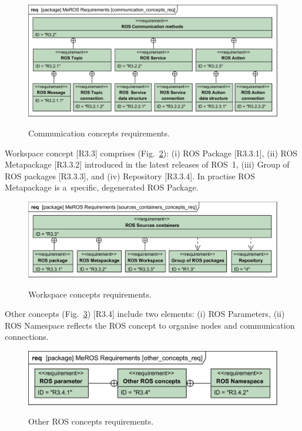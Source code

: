 \documentclass[11pt,oneside,a4paper]{report}
\begin{document}
	\begin{figure}[H]
		\centering
		\begin{center}
			{\includegraphics[scale=.98]{diagrams/communication_concepts_req.png}}
		\end{center}
		\caption{Communication concepts requirements.} 
		\label{fig:communication_concepts_req}
	\end{figure}
	
	Workspace concept [R3.3] comprises (Fig.~\ref{fig:workspace_concepts_req}): (i) ROS Package [R3.3.1], (ii) ROS Metapackage [R3.3.2] introduced in the latest releases of ROS~1, (iii) Group of ROS packages [R3.3.3], and (iv) Repository [R3.3.4]. In practise ROS Metapackage is a~specific, degenerated ROS Package.
	
	\begin{figure}[H]
		\centering
		\begin{center}
			{\includegraphics[scale=1.0]{diagrams/sources_containers_concepts_req.png}}
		\end{center}
		\caption{Workspace concepts requirements.} 
		\label{fig:workspace_concepts_req}
	\end{figure}
	
	\pagebreak
	
	Other concepts (Fig.~\ref{fig:other_concepts_req}) [R3.4] include two elements: (i) ROS Parameters, (ii) ROS Namespace reflects the ROS concept to organise nodes and communication connections.
	
	\begin{figure}[H]
			\centering
			\begin{center}
					{\includegraphics[scale=1.0]{diagrams/other_concepts_req.png}}
				\end{center}
			\caption{Other ROS concepts requirements.} 
			\label{fig:other_concepts_req}
		\end{figure}
\end{document}
